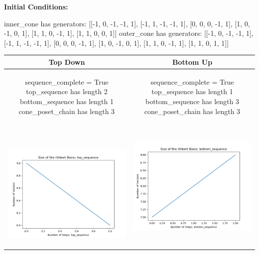 \documentclass[10pt]{article}
\begin{document}
\textbf{Initial Conditions:}
\begin{SAGE}
inner_cone has generators: 
[[-1, 0, -1, -1, 1], [-1, 1, -1, -1, 1], [0, 0, 0, -1, 1], [1, 0, -1, 0, 1], [1, 1, 0, -1, 1], [1, 1, 0, 0, 1]]
outer_cone has generators: 
[[-1, 0, -1, -1, 1], [-1, 1, -1, -1, 1], [0, 0, 0, -1, 1], [1, 0, -1, 0, 1], [1, 1, 0, -1, 1], [1, 1, 0, 1, 1]]

\end{SAGE}
\begin{tabular}{c|c}
\textbf{Top Down} & \textbf{Bottom Up} \\ \hline  
\begin{SAGE}
	sequence_complete = True
	top_sequence has length 2
	bottom_sequence has length 1
	cone_poset_chain has length 3
\end{SAGE} 
&
\begin{SAGE}
	sequence_complete = True
	top_sequence has length 1
	bottom_sequence has length 3
	cone_poset_chain has length 3
\end{SAGE} 
\\ \hline
\
\begin{minipage}{.45\textwidth}
\includegraphics[width=\textwidth]{"DATA/5d/6 generators 1 bound A/top_sequence SIZE"}
\end{minipage} &
\begin{minipage}{.45\textwidth}
\includegraphics[width=\textwidth]{"DATA/5d/6 generators 1 bound A bottomup/bottom_sequence SIZE"}

\end{minipage}
\end{tabular}
\end{document}
